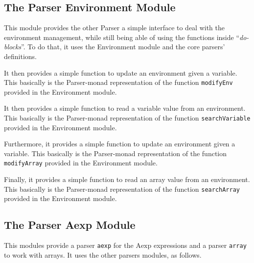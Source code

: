 \documentclass{esposito-documentation}
\begin{document}
\subsection{The Parser Environment Module}


This module provides the other Parser a simple interface to deal with the
environment management, while still being able of using the functions inside
``\emph{do-blocks}''. To do that, it uses the Environment module and the core
parsers' definitions.



It then provides a simple function to update an environment given a variable.
This basically is the Parser-monad representation of the function
\lstinline|modifyEnv| provided in the Environment module.



It then provides a simple function to read a variable value from an
environment. This basically is the Parser-monad representation of the function
\lstinline|searchVariable| provided in the Environment module.



Furthermore, it provides a simple function to update an environment given a
variable.  This basically is the Parser-monad representation of the function
\lstinline|modifyArray| provided in the Environment module.



Finally, it provides a simple function to read an array value from an
environment. This basically is the Parser-monad representation of the function
\lstinline|searchArray| provided in the Environment module.



\subsection{The Parser Aexp Module}


This modules provide a parser \lstinline|aexp| for the $\mathrm{Aexp}$
expressions and a parser \lstinline|array| to work with arrays. It uses the
other parsers modules, as follows.
\end{document}
